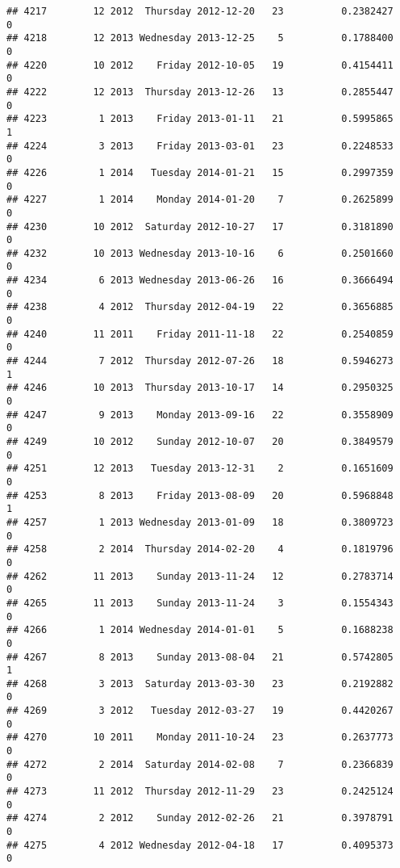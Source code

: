 \documentclass[
]{article}
\begin{document}
\begin{verbatim}
## 4217        12 2012  Thursday 2012-12-20   23          0.2382427             0
## 4218        12 2013 Wednesday 2013-12-25    5          0.1788400             0
## 4220        10 2012    Friday 2012-10-05   19          0.4154411             0
## 4222        12 2013  Thursday 2013-12-26   13          0.2855447             0
## 4223         1 2013    Friday 2013-01-11   21          0.5995865             1
## 4224         3 2013    Friday 2013-03-01   23          0.2248533             0
## 4226         1 2014   Tuesday 2014-01-21   15          0.2997359             0
## 4227         1 2014    Monday 2014-01-20    7          0.2625899             0
## 4230        10 2012  Saturday 2012-10-27   17          0.3181890             0
## 4232        10 2013 Wednesday 2013-10-16    6          0.2501660             0
## 4234         6 2013 Wednesday 2013-06-26   16          0.3666494             0
## 4238         4 2012  Thursday 2012-04-19   22          0.3656885             0
## 4240        11 2011    Friday 2011-11-18   22          0.2540859             0
## 4244         7 2012  Thursday 2012-07-26   18          0.5946273             1
## 4246        10 2013  Thursday 2013-10-17   14          0.2950325             0
## 4247         9 2013    Monday 2013-09-16   22          0.3558909             0
## 4249        10 2012    Sunday 2012-10-07   20          0.3849579             0
## 4251        12 2013   Tuesday 2013-12-31    2          0.1651609             0
## 4253         8 2013    Friday 2013-08-09   20          0.5968848             1
## 4257         1 2013 Wednesday 2013-01-09   18          0.3809723             0
## 4258         2 2014  Thursday 2014-02-20    4          0.1819796             0
## 4262        11 2013    Sunday 2013-11-24   12          0.2783714             0
## 4265        11 2013    Sunday 2013-11-24    3          0.1554343             0
## 4266         1 2014 Wednesday 2014-01-01    5          0.1688238             0
## 4267         8 2013    Sunday 2013-08-04   21          0.5742805             1
## 4268         3 2013  Saturday 2013-03-30   23          0.2192882             0
## 4269         3 2012   Tuesday 2012-03-27   19          0.4420267             0
## 4270        10 2011    Monday 2011-10-24   23          0.2637773             0
## 4272         2 2014  Saturday 2014-02-08    7          0.2366839             0
## 4273        11 2012  Thursday 2012-11-29   23          0.2425124             0
## 4274         2 2012    Sunday 2012-02-26   21          0.3978791             0
## 4275         4 2012 Wednesday 2012-04-18   17          0.4095373             0

\end{verbatim}
\end{document}
